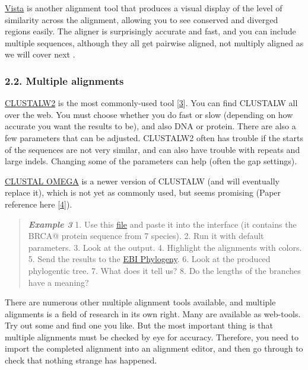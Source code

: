 \documentclass[]{article}
\begin{document}
\href{http://genome.lbl.gov/vista/index.shtml}{Vista} is another
alignment tool that produces a visual display of the level of similarity
across the alignment, allowing you to see conserved and diverged regions
easily. The aligner is surprisingly accurate and fast, and you can
include multiple sequences, although they all get pairwise aligned, not
multiply aligned as we will cover next .

\subsubsection{2.2. Multiple alignments}\label{multiple-alignments}

\href{https://www.ebi.ac.uk/Tools/msa/clustalw2/}{CLUSTALW2} is the most
commonly-used tool
{[}\href{http://www.ncbi.nlm.nih.gov/pubmed/17846036}{3}{]}. You can
find CLUSTALW all over the web. You must choose whether you do fast or
slow (depending on how accurate you want the results to be), and also
DNA or protein. There are also a few parameters that can be adjusted.
CLUSTALW2 often has trouble if the starts of the sequences are not very
similar, and can also have trouble with repeats and large indels.
Changing some of the parameters can help (often the gap settings).

\href{https://www.ebi.ac.uk/Tools/msa/clustalo/}{CLUSTAL OMEGA} is a
newer version of CLUSTALW (and will eventually replace it), which is not
yet as commonly used, but seems promising (Paper reference here
{[}\href{http://msb.embopress.org/content/7/1/539}{4}{]}).

\begin{quote}
\emph{\textbf{Example 3}} 1. Use this
\href{http://compbio.massey.ac.nz/wiki/data/c1/BRCA2_aa.fasta}{file} and
paste it into the interface (it contains the BRCA@ protein sequence from
7 species). 2. Run it with default parameters. 3. Look at the output. 4.
Highlight the alignments with colors. 5. Send the results to the
\href{https://www.ebi.ac.uk/Tools/phylogeny/clustalw2_phylogeny/}{EBI
Phylogeny}. 6. Look at the produced phylogentic tree. 7. What does it
tell us? 8. Do the lengths of the branches have a meaning?
\end{quote}

There are numerous other multiple alignment tools available, and
multiple alignments is a field of research in its own right. Many are
available as web-tools. Try out some and find one you like. But the most
important thing is that multiple alignments must be checked by eye for
accuracy. Therefore, you need to import the completed alignment into an
alignment editor, and then go through to check that nothing strange has
happened.
\end{document}
